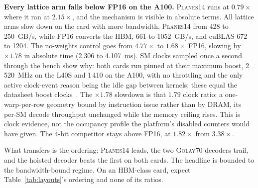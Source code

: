 \textbf{Every lattice arm falls below FP16 on the A100.} \textsc{Planes14}
runs at $0.79\times$ where it ran at $2.15\times$, and the mechanism is
visible in absolute terms. All lattice arms slow down on the card with more
bandwidth, \textsc{Planes14} from 428 to 250~GB/s, while FP16 converts the
HBM, 661 to 1052~GB/s, and cuBLAS 672 to 1204. The no-weights control goes
from $4.77\times$ to $1.68\times$ FP16, slowing by $\times 1.78$ in
absolute time (2.306 to 4.107~ms). SM clocks sampled once a second through
the bench show why: both cards run pinned at their maximum boost, 2\,520~MHz
on the L40S and 1\,410 on the A100, with no throttling and the only active
clock-event reason being the idle gap between kernels; these equal the
datasheet boost clocks~\citep{nvidia_l40s_datasheet,nvidia_a100_datasheet}. The
$\times 1.78$ slowdown is that $1.79$ clock ratio: a one-warp-per-row
geometry bound by instruction issue rather than by DRAM, its per-SM decode
throughput unchanged while the memory ceiling rises. This is clock evidence,
not the occupancy profile the platform's disabled counters would have given.
The 4-bit competitor stays above FP16, at $1.82\times$ from $3.38\times$.

What transfers is the ordering: \textsc{Planes14} leads, the two
\textsc{Golay70} decoders trail, and the hoisted decoder beats the first
on both cards. The
headline is bounded to the bandwidth-bound regime. On an HBM-class card,
expect Table~\ref{tab:layouts}'s ordering and none of its ratios.

